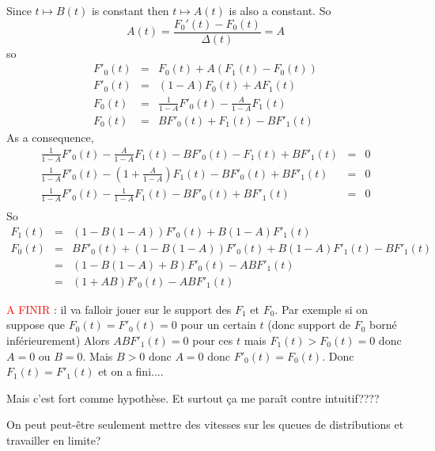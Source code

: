  Since $t  \mapsto B(t)$ is constant then  $t  \mapsto A(t)$ is also a constant. 
So 
$$ A(t) = \frac{F_0'(t)-F_0(t)}{\Delta(t)} = A$$
so
\begin{eqnarray*}
 F'_0(t) &=& F_0(t) +  A(F_1(t) - F_0(t))\\
 F'_0(t) &=& (1-A) F_0(t) + A F_1(t)\\
F_0(t) &=& \frac{1}{1-A} F'_0(t) - \frac{A}{1-A} F_1(t)\\
F_0(t) &=& B F'_0(t) + F_1(t)  - B F'_1(t) 
\end{eqnarray*}
As a consequence, 
\begin{eqnarray*}
 \frac{1}{1-A} F'_0(t) - \frac{A}{1-A} F_1(t) - B F'_0(t) - F_1(t)  +B F'_1(t) &=& 0\\
\frac{1}{1-A} F'_0(t) - \left(1+ \frac{A}{1-A}\right) F_1(t) - B F'_0(t) +B F'_1(t) &=& 0\\
 \frac{1}{1-A} F'_0(t) - \frac{1}{1-A} F_1(t) - B F'_0(t) +B F'_1(t) &=& 0\\
  \end{eqnarray*}
  So
  \begin{eqnarray*}
 F_1(t) &=&(1- B(1-A)) F'_0(t) + B(1-A)F'_1(t)\\
 F_0(t) &= &B F'_0(t) + (1- B(1-A)) F'_0(t) +B(1-A)F'_1(t) - BF'_1(t)\\
 &=& (1- B(1-A)+B)F'_0(t) -AB F'_1(t)\\
 &=& (1 + AB)F'_0(t) -  AB F'_1(t)
  \end{eqnarray*}

 


\textcolor{red}{A FINIR} : il va falloir jouer sur le support des $F_1$ et $F_0$. Par exemple si on suppose que  $F_0(t) = F'_0(t) = 0 $ pour un certain $t$ (donc support de $F_0$ borné inférieurement) 
Alors $AB F'_1(t) = 0$ pour ces $t$ mais $F_1(t) > F_0(t) =0 $ donc $A=0$ ou $B=0$. Mais $B>0$ donc $A = 0$ donc $F'_0(t) = F_0(t)$. Donc $F_1(t) = F'_1(t)$ et on a fini.... 

Mais c'est fort comme hypothèse. Et surtout ça me paraît contre intuitif???? 
 
On peut peut-être seulement mettre des vitesses sur les queues de distributions et travailler en limite? 







